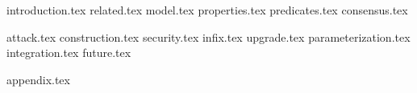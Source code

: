 {introduction.tex}
{related.tex}
{model.tex}
{properties.tex}
{predicates.tex}
{consensus.tex}


{attack.tex}
{construction.tex}
{security.tex}
{infix.tex}
{upgrade.tex}
{parameterization.tex}
{integration.tex}
{future.tex}


{appendix.tex}

